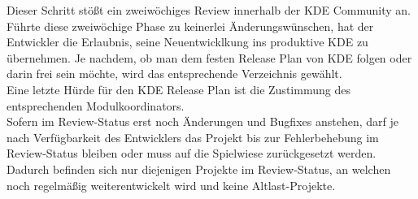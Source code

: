 \documentclass[10pt,a4paper,twocolumn]{article}
\begin{document}
Dieser Schritt stößt ein zweiwöchiges Review innerhalb der KDE Community an. Führte diese zweiwöchige Phase zu keinerlei Änderungswünschen, hat der Entwickler die Erlaubnis, seine Neuentwicklkung ins produktive KDE zu übernehmen. Je nachdem, ob man dem festen Release Plan von KDE folgen oder darin frei sein möchte, wird das entsprechende Verzeichnis gewählt.\\
Eine letzte Hürde für den KDE Release Plan ist die Zustimmung des entsprechenden Modulkoordinators.\\
Sofern im Review-Status erst noch Änderungen und Bugfixes anstehen, darf je nach Verfügbarkeit des Entwicklers das Projekt bis zur Fehlerbehebung im Review-Status bleiben oder muss auf die Spielwiese zurückgesetzt werden. Dadurch befinden sich nur diejenigen Projekte im Review-Status, an welchen noch regelmäßig weiterentwickelt wird und keine Altlast-Projekte.
\cite{ApplLife}
\end{document}
